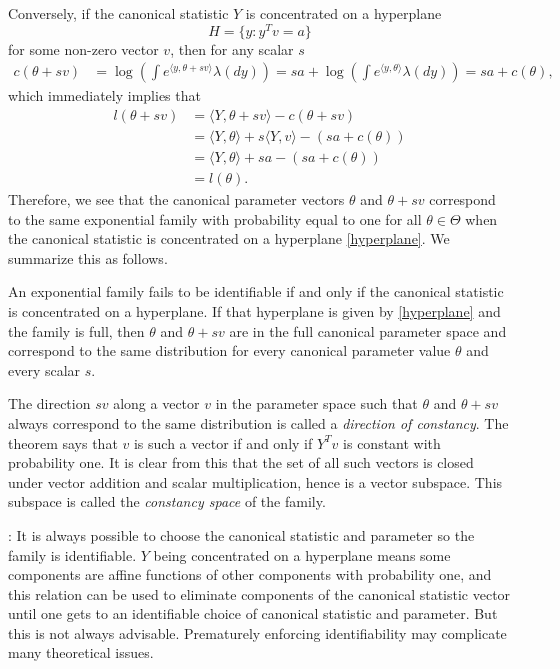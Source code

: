 \documentclass[
]{article}
\begin{document}
Conversely, if the canonical statistic \(Y\) is concentrated on a
hyperplane \begin{equation}\label{hyperplane}
  H = \{y : y^Tv = a\}
\end{equation} for some non-zero vector \(v\), then for any scalar \(s\)
\begin{align*}
  c(\theta + sv) &= \log\left(\int e^{\langle y, \theta + sv \rangle}\lambda(dy)\right) = sa + \log\left(\int e^{\langle y,\theta \rangle}\lambda(dy)\right) = sa + c(\theta),
\end{align*} which immediately implies that \begin{align*}
  l(\theta + sv) &= \langle Y,\theta +sv \rangle - c(\theta + sv) \\
    &= \langle Y,\theta \rangle + s\langle Y,v \rangle - \left(sa + c(\theta)\right) \\
    &= \langle Y,\theta \rangle + sa - \left(sa + c(\theta)\right) \\
    &= l(\theta).
\end{align*} Therefore, we see that the canonical parameter vectors
\(\theta\) and \(\theta + sv\) correspond to the same exponential family
with probability equal to one for all \(\theta \in \Theta\) when the
canonical statistic is concentrated on a hyperplane \eqref{hyperplane}.
We summarize this as follows.

\begin{thm} \label{thm-identifiable}
An exponential family fails to be identifiable if and only if the canonical statistic is concentrated on a hyperplane. If that hyperplane is given by \eqref{hyperplane} and the family is full, then $\theta$ and $\theta+sv$ are in the full canonical parameter space and correspond to the same distribution for every canonical parameter value $\theta$ and every scalar $s$.
\end{thm}

The direction \(sv\) along a vector \(v\) in the parameter space such
that \(\theta\) and \(\theta + sv\) always correspond to the same
distribution is called a \emph{direction of constancy}. The theorem says
that \(v\) is such a vector if and only if \(Y^Tv\) is constant with
probability one. It is clear from this that the set of all such vectors
is closed under vector addition and scalar multiplication, hence is a
vector subspace. This subspace is called the \emph{constancy space} of
the family. \vspace{0.5cm}

: It is always possible to choose the canonical
statistic and parameter so the family is identifiable. \(Y\) being
concentrated on a hyperplane means some components are affine functions
of other components with probability one, and this relation can be used
to eliminate components of the canonical statistic vector until one gets
to an identifiable choice of canonical statistic and parameter. But this
is not always advisable. Prematurely enforcing identifiability may
complicate many theoretical issues.
\end{document}
